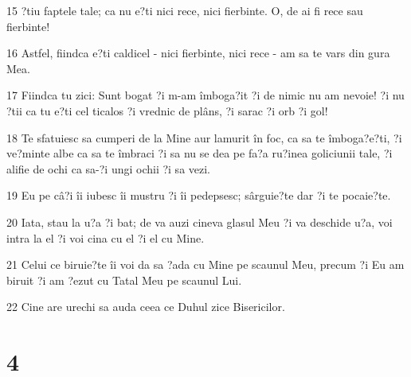 \par 15 ?tiu faptele tale; ca nu e?ti nici rece, nici fierbinte. O, de ai fi rece sau fierbinte!
\par 16 Astfel, fiindca e?ti caldicel - nici fierbinte, nici rece - am sa te vars din gura Mea.
\par 17 Fiindca tu zici: Sunt bogat ?i m-am îmboga?it ?i de nimic nu am nevoie! ?i nu ?tii ca tu e?ti cel ticalos ?i vrednic de plâns, ?i sarac ?i orb ?i gol!
\par 18 Te sfatuiesc sa cumperi de la Mine aur lamurit în foc, ca sa te îmboga?e?ti, ?i ve?minte albe ca sa te îmbraci ?i sa nu se dea pe fa?a ru?inea goliciunii tale, ?i alifie de ochi ca sa-?i ungi ochii ?i sa vezi.
\par 19 Eu pe câ?i îi iubesc îi mustru ?i îi pedepsesc; sârguie?te dar ?i te pocaie?te.
\par 20 Iata, stau la u?a ?i bat; de va auzi cineva glasul Meu ?i va deschide u?a, voi intra la el ?i voi cina cu el ?i el cu Mine.
\par 21 Celui ce biruie?te îi voi da sa ?ada cu Mine pe scaunul Meu, precum ?i Eu am biruit ?i am ?ezut cu Tatal Meu pe scaunul Lui.
\par 22 Cine are urechi sa auda ceea ce Duhul zice Bisericilor.

\chapter{4}

